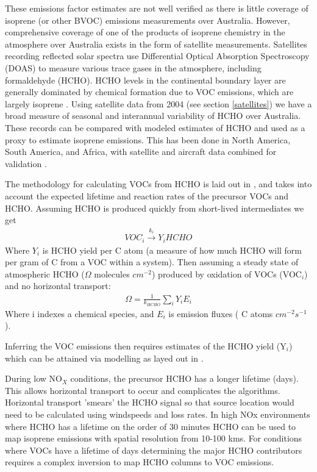 These emissions factor estimates are not well verified as there is little coverage of isoprene (or other BVOC) emissions measurements over Australia. However, comprehensive coverage of one of the products of isoprene chemistry in the atmosphere over Australia exists in the form of satellite measurements. 
Satellites recording reflected solar spectra use Differential Optical Absorption Spectroscopy (DOAS) to measure various trace gases in the atmosphere, including formaldehyde (HCHO). HCHO levels in the continental boundary layer are generally dominated by chemical formation due to VOC emissions, which are largely isoprene \cite{Kefauver_2014}.
Using satellite data from 2004 (see section \ref{satellites}) we have a broad measure of seasonal and interannual variability of HCHO over Australia. These records can be compared with modeled estimates of HCHO and used as a proxy to estimate isoprene emissions. This has been done in North America, South America, and Africa, with satellite and aircraft data combined for validation \cite{Millet_2006, Marais_2014}.

The methodology for calculating VOCs from HCHO is laid out in \citet{Palmer_2003}, and takes into account the expected lifetime and reaction rates of the precursor VOCs and HCHO.
Assuming HCHO is produced quickly from short-lived intermediates we get
\begin{eqnarray*}
VOC_i \overset{k_i}{\rightarrow} Y_i HCHO
\end{eqnarray*}
Where $Y_i$ is HCHO yield per C atom (a measure of how much HCHO will form per gram of C from a VOC within a system).
Then assuming a steady state of atmospheric HCHO ($\Omega$ molecules $cm^{-2}$) produced by oxidation of VOCs (VOC$_i$) and no horizontal transport:
\begin{eqnarray*}
\Omega = \frac{1}{k_{HCHO}} \sum_{i} Y_i E_i
\end{eqnarray*}
Where i indexes a chemical species, and $E_i$ is emission fluxes ( C atoms $cm^{-2}s^{-1}$).

Inferring the VOC emissions then requires estimates of the HCHO yield (Y$_i$) which can be attained via modelling as layed out in \citet{Millet_2006}.

During low NO$_X$ conditions, the precursor HCHO has a longer lifetime (days).
This allows horizontal transport to occur and complicates the algorithms.
Horizontal transport 'smears' the HCHO signal so that source location would need to be calculated using windspeeds and loss rates.
In high NOx environments where HCHO has a lifetime on the order of 30 minutes HCHO can be used to map isoprene emissions with spatial resolution from 10-100 kms.
For conditions where VOCs have a lifetime of days determining the major HCHO contributors requires a complex inversion to map HCHO columns to VOC emissions.

